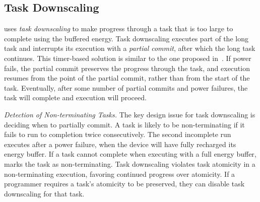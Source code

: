 
\subsection{Task Downscaling}
\label{sec:task_downsizing}

\sys uses {\em task downscaling} to make progress through a task that is too large to complete using the buffered energy. Task downscaling executes part of the long task and interrupts its execution with a {\em partial commit}, after which the long task continues. This timer-based solution is similar to the one proposed in~\cite{ratchet}. If power fails, the partial commit preserves the progress through the task, and execution resumes from the point of the partial commit, rather than from the start of the task. Eventually, after some number of partial commits and power failures, the task will complete and execution will proceed. 

\textit{Detection of Non-terminating Tasks.} The key design issue for task downscaling is deciding when to partially commit. A task is likely to be non-terminating if it fails to run to completion twice consecutively. 
The second incomplete run executes after a power failure, when the device will have fully recharged its energy buffer. If a task cannot complete when executing with a full energy buffer, \sys marks the task as non-terminating.
Task downscaling violates task atomicity in a non-terminating execution, favoring continued progress over atomicity. If a programmer requires a task's atomicity to be preserved, they can disable task downscaling for that task. 